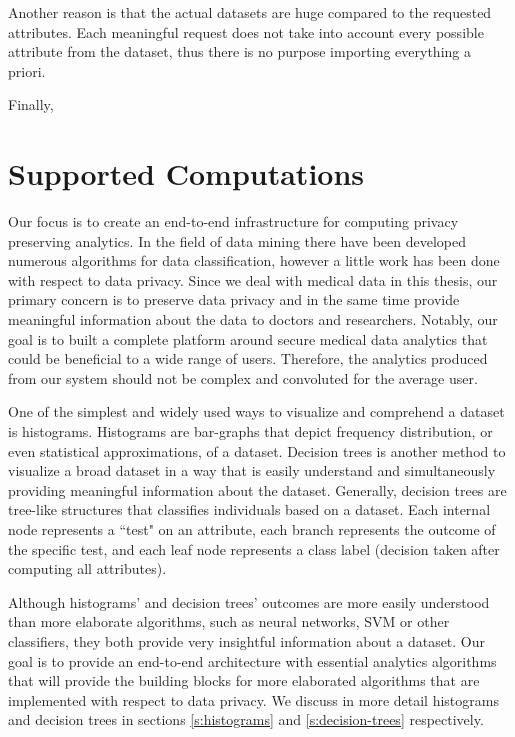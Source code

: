 Another reason is that the actual datasets are huge compared to the requested attributes.
Each meaningful request does not take into account every possible attribute from the dataset, thus there is no purpose importing everything a priori.


Finally, 



\section{Supported Computations}\label{s:computations}
Our focus is to create an end-to-end infrastructure for computing privacy preserving analytics.
In the field of data mining there have been developed numerous algorithms for data classification, however a little work has been done with respect to data privacy.
Since we deal with medical data in this thesis, our primary concern is to preserve data privacy and in the same time provide meaningful information about the data to doctors and researchers.
Notably, our goal is to built a complete platform around secure medical data analytics that could be beneficial to a wide range of users.
Therefore, the analytics produced from our system should not be complex and convoluted for the average user.

One of the simplest and widely used ways to visualize and comprehend a dataset is histograms.
Histograms are bar-graphs that depict frequency distribution, or even statistical approximations, of a dataset.
Decision trees is another method to visualize a broad dataset in a way that is easily understand and simultaneously providing meaningful information about the dataset.
Generally, decision trees are tree-like structures that classifies individuals based on a dataset.
Each internal node represents a ``test" on an attribute, each branch represents the outcome of the specific test, and each leaf node represents a class label (decision taken after computing all attributes).

Although histograms' and decision trees' outcomes are more easily understood than more elaborate algorithms, such as neural networks, SVM or other classifiers, they both provide very insightful information about a dataset.
Our goal is to provide an end-to-end architecture with essential analytics algorithms that will provide the building blocks for more elaborated algorithms that are implemented with respect to data privacy.
We discuss in more detail histograms and decision trees in sections \ref{s:histograms} and \ref{s:decision-trees} respectively.



